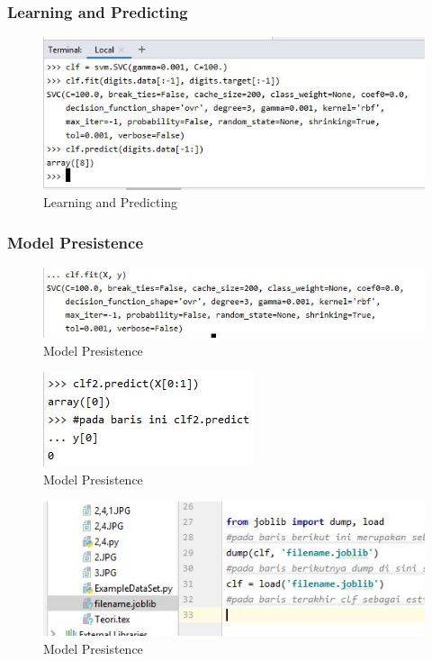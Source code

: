 \subsubsection{Learning and Predicting}

\begin{figure}[ht]
\centering
\includegraphics[scale=0.5]{figures/1174042/chapter1/2,3.jpg}
\caption{Learning and Predicting}
\label{contoh}
\end{figure}

\subsubsection{Model Presistence}

\begin{figure}[ht]
\centering
\includegraphics[scale=0.5]{figures/1174042/chapter1/2,4.jpg}
\caption{Model Presistence}
\label{contoh}
\end{figure}

\begin{figure}[ht]
\centering
\includegraphics[scale=0.5]{figures/1174042/chapter1/2,4,1.jpg}
\caption{Model Presistence}
\label{contoh}
\end{figure}

\begin{figure}[ht]
\centering
\includegraphics[scale=0.5]{figures/1174042/chapter1/2,4,2.jpg}
\caption{Model Presistence}
\label{contoh}
\end{figure}

